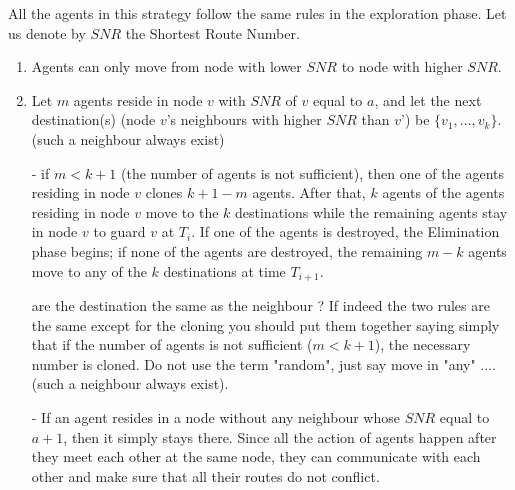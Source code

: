 All the agents in this strategy follow the same rules in the exploration phase.
Let us denote by $SNR$ the Shortest Route Number.
\begin{enumerate}
\item Agents can only move from node with lower $SNR$ to node with higher $SNR$.
\item Let  $m$ agents reside in node $v$ with   $SNR$ of $v$ equal to $a$, and let  the next destination(s) (node $v$'s neighbours with higher $SNR$ than $v$') be $\{v_1,\ldots, v_k\}$. (such a neighbour always exist)

- if $m<k+1$ (the number of agents is not sufficient), then one of the agents residing in node $v$ clones $k+1-m$ agents. After that, $k$ agents of the agents residing in node $v$ move to the $k$ destinations while the remaining agents stay in node $v$ to guard $v$ at $T_i$. 
 If one of the agents is destroyed, the Elimination phase begins; if none of the agents are destroyed, the remaining $m-k$ agents %
move to any of the $k$ destinations at  time $T_{i+1}$. 
 
 \color{blue} are the destination the same as the neighbour ? If indeed the two rules are the same except for the cloning you should put them together saying simply that if the number of agents is not sufficient ($m< k+1$), the necessary number is cloned.  Do not use the term "random", just say move in "any" ....\color{black} \\
     \color{blue} (such a neighbour always exist). \color{black}
     
- If an agent resides in a node without any neighbour whose $SNR$ equal to $a+1$, then it simply stays there.
 \color{black}
        Since all the action of agents happen after they meet each other at the same node, they can communicate with each other and make sure that all their routes do not conflict.
% 
\end{enumerate}
